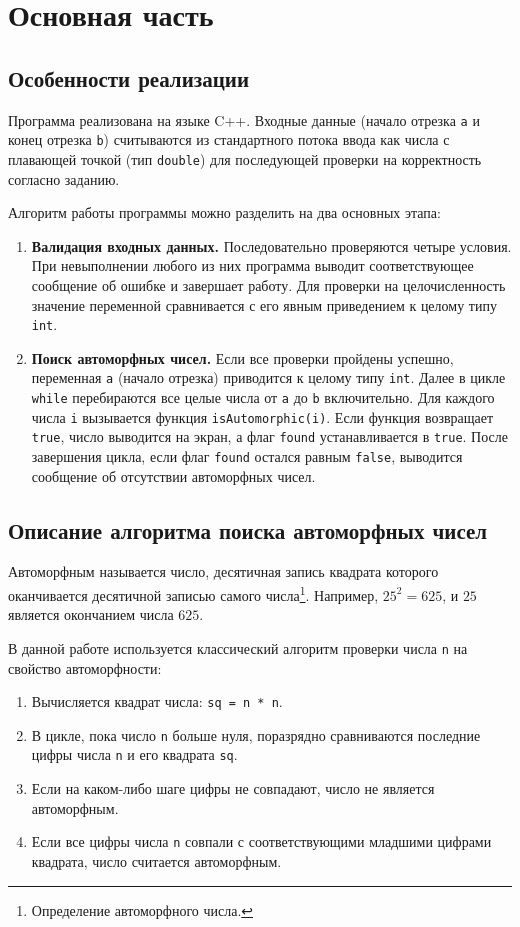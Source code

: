\documentclass[a4paper, 12pt]{report} %
\begin{document}
	\chapter{Основная часть}
	\section{Особенности реализации}
	Программа реализована на языке C++. Входные данные (начало отрезка \texttt{a} и конец отрезка \texttt{b}) считываются из стандартного потока ввода как числа с плавающей точкой (тип \texttt{double}) для последующей проверки на корректность согласно заданию.
	
	Алгоритм работы программы можно разделить на два основных этапа:
	\begin{enumerate} %
		\item \textbf{Валидация входных данных.} Последовательно проверяются четыре условия.
		При невыполнении любого из них программа выводит соответствующее сообщение об ошибке и завершает работу.
		Для проверки на целочисленность значение переменной сравнивается с его явным приведением к целому типу \texttt{int}.
		\item \textbf{Поиск автоморфных чисел.} Если все проверки пройдены успешно, переменная \texttt{a} (начало отрезка)
		приводится к целому типу \texttt{int}. Далее в цикле \texttt{while} перебираются все целые числа от \texttt{a} до \texttt{b}
		включительно. Для каждого числа \texttt{i} вызывается функция \texttt{isAutomorphic(i)}. Если функция возвращает \texttt{true},
		число выводится на экран, а флаг \texttt{found} устанавливается в \texttt{true}.
		После завершения цикла, если флаг \texttt{found} остался равным \texttt{false}, выводится сообщение об отсутствии автоморфных чисел.
	\end{enumerate}
	
	\section{Описание алгоритма поиска автоморфных чисел}
	Автоморфным называется число, десятичная запись квадрата которого оканчивается
	десятичной записью самого числа\footnote{Определение автоморфного числа.}. %
	Например, $25^2 = 625$, и $25$ является окончанием числа $625$.
	
	В данной работе используется классический алгоритм проверки числа \texttt{n} на свойство автоморфности:
	\begin{enumerate}
		\item Вычисляется квадрат числа: \texttt{sq = n * n}.
		\item В цикле, пока число \texttt{n} больше нуля, поразрядно сравниваются последние цифры числа \texttt{n} и его квадрата \texttt{sq}.
		\item Если на каком-либо шаге цифры не совпадают, число не является автоморфным.
		\item Если все цифры числа \texttt{n} совпали с соответствующими младшими цифрами квадрата, число считается автоморфным.
	\end{enumerate}
	
\end{document}
